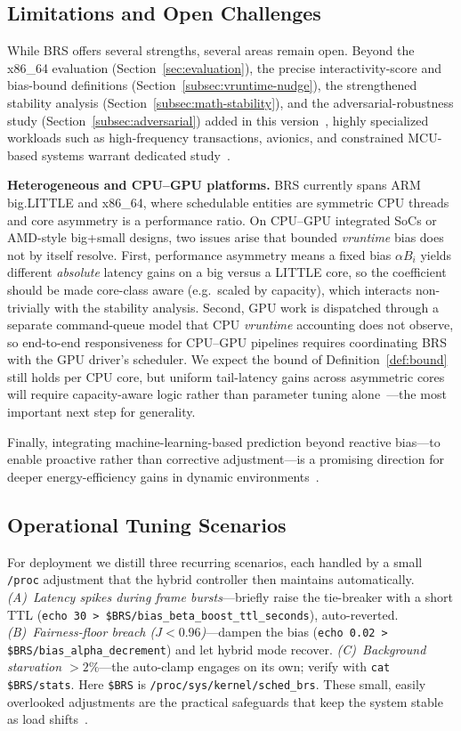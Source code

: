 \subsection{Limitations and Open Challenges}
While BRS offers several strengths, several areas remain open. Beyond the x86\_64 evaluation (Section~\ref{sec:evaluation}), the precise interactivity-score and bias-bound definitions (Section~\ref{subsec:vruntime-nudge}), the strengthened stability analysis (Section~\ref{subsec:math-stability}), and the adversarial-robustness study (Section~\ref{subsec:adversarial}) added in this version~\cite{8758850,8894365}, highly specialized workloads such as high-frequency transactions, avionics, and constrained MCU-based systems warrant dedicated study~\cite{9999639,10007654}.

\textbf{Heterogeneous and CPU--GPU platforms.} BRS currently spans ARM big.LITTLE and x86\_64, where schedulable entities are symmetric CPU threads and core asymmetry is a performance ratio. On CPU--GPU integrated SoCs or AMD-style big+small designs, two issues arise that bounded \textit{vruntime} bias does not by itself resolve. First, performance asymmetry means a fixed bias $\alpha B_i$ yields different \emph{absolute} latency gains on a big versus a LITTLE core, so the coefficient should be made core-class aware (e.g.\ scaled by capacity), which interacts non-trivially with the stability analysis. Second, GPU work is dispatched through a separate command-queue model that CPU \textit{vruntime} accounting does not observe, so end-to-end responsiveness for CPU--GPU pipelines requires coordinating BRS with the GPU driver's scheduler. We expect the bound of Definition~\ref{def:bound} still holds per CPU core, but uniform tail-latency gains across asymmetric cores will require capacity-aware logic rather than parameter tuning alone~\cite{6882237,6899614,9979771}---the most important next step for generality.

Finally, integrating machine-learning-based prediction beyond reactive bias---to enable proactive rather than corrective adjustment---is a promising direction for deeper energy-efficiency gains in dynamic environments~\cite{7426385,Zhang2025Tail}.


\subsection{Operational Tuning Scenarios}
For deployment we distill three recurring scenarios, each handled by a small \texttt{/proc} adjustment that the hybrid controller then maintains automatically. \emph{(A)~Latency spikes during frame bursts}---briefly raise the tie-breaker with a short TTL (\texttt{echo 30 > \$BRS/bias\_beta\_boost\_ttl\_seconds}), auto-reverted. \emph{(B)~Fairness-floor breach ($J<0.96$)}---dampen the bias (\texttt{echo 0.02 > \$BRS/bias\_alpha\_decrement}) and let hybrid mode recover. \emph{(C)~Background starvation $>2\%$}---the auto-clamp engages on its own; verify with \texttt{cat \$BRS/stats}. Here \texttt{\$BRS} is \texttt{/proc/sys/kernel/sched\_brs}. These small, easily overlooked adjustments are the practical safeguards that keep the system stable as load shifts~\cite{5580094,5169938}.

